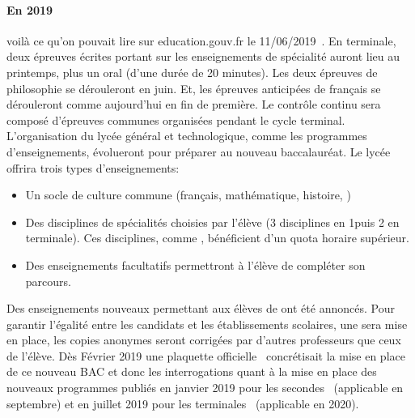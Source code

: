         \paragraph{En 2019}\label{sec:ref_2019}
             voilà ce qu'on pouvait lire sur education.gouv.fr le 11/06/2019~.
            En terminale, deux épreuves écrites portant sur les enseignements de spécialité auront lieu au printemps, plus un oral (d'une durée de 20 minutes). Les deux épreuves de philosophie se dérouleront en juin. Et, les épreuves anticipées de français se dérouleront comme aujourd'hui en fin de première.
            Le contrôle continu sera composé d'épreuves communes organisées pendant le cycle terminal.
            L'organisation du lycée général et technologique, comme les programmes d'enseignements, évolueront pour préparer au nouveau baccalauréat.
            Le lycée offrira trois types d'enseignements:
            \begin{itemize}
                \item Un socle de culture commune (français, mathématique, histoire, \etc)
                \item Des disciplines de spécialités choisies par l'élève (3 disciplines en 1\iere puis 2 en terminale). Ces disciplines, comme , bénéficient d'un quota horaire supérieur.
                \item Des enseignements facultatifs permettront à l'élève de compléter son parcours.
            \end{itemize}
            Des enseignements nouveaux permettant aux élèves de  ont été annoncés.
            Pour garantir l'égalité entre les candidats et les établissements scolaires, une  sera mise en place, les copies anonymes seront corrigées par d'autres professeurs que ceux de l'élève.%
            Dès Février 2019 une plaquette officielle~ concrétisait la mise en place de ce nouveau BAC et donc les interrogations quant à la mise en place des nouveaux programmes publiés en janvier 2019 pour les secondes~ (applicable en septembre) et en juillet 2019 pour les terminales~ (applicable en 2020).%

